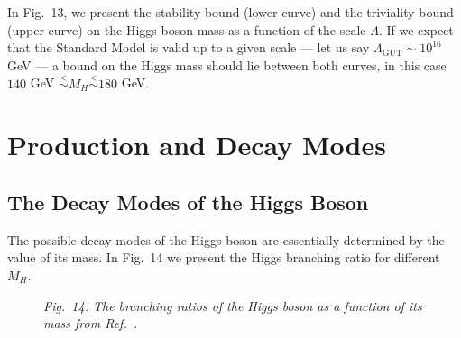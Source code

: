 \documentclass[12pt]{report}
\def\text#1{{\scriptstyle\mathrm{#1}}}
\renewcommand{\lesssim}{\stackrel{<}{\sim}}
\begin{document}
In Fig.\ 13, we present the stability bound (lower curve) and the
triviality bound (upper curve) on the Higgs boson mass as a function
of the scale $\Lambda$. If we expect that the Standard Model is valid
up to a given scale --- let us say $\Lambda_{\text{GUT}} \sim
10^{16}$ GeV \cite{Ross:84} --- a bound on the Higgs mass should lie
between both curves, in this case $140$ GeV $\lesssim M_H \lesssim
180$ GeV.

\section{Production and Decay Modes}

\subsection{The Decay Modes of the Higgs Boson} \indent 

The possible decay modes of the Higgs boson are essentially determined
by the value of its mass. In Fig.\ 14 we present the Higgs branching
ratio for different $M_H$. 

\begin{figure}[ht]
\protect
\epsfxsize=10cm
\begin{center}
\mbox{}
\end{center}
\begin{center}
\begin{minipage}[h]{12cm}
\begin{center}
{\it Fig.\ 14: The branching ratios of the Higgs boson as a function of
its mass from Ref.\ \cite{Spira:98}.}
\end{center}
\end{minipage}
\end{center}
\end{figure}
\end{document}
